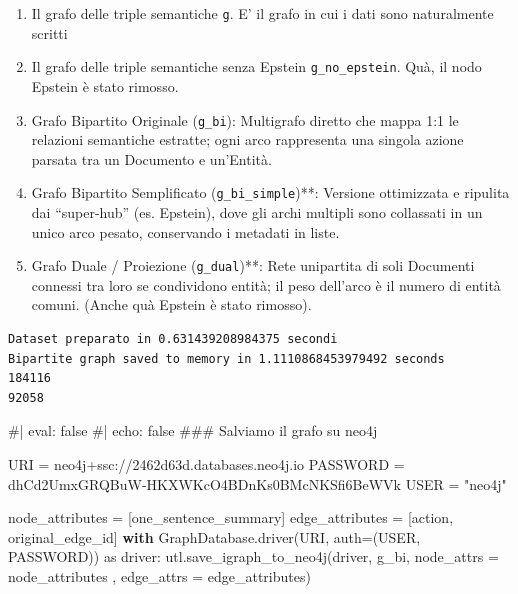 \documentclass[
  italian,
  a4paper,
]{article}
\newenvironment{Shaded}{\begin{snugshade}}{\end{snugshade}}
\newcommand{\CommentTok}[1]{\textcolor[rgb]{0.37,0.37,0.37}{#1}}
\newcommand{\ControlFlowTok}[1]{\textcolor[rgb]{0.00,0.23,0.31}{\textbf{#1}}}
\newcommand{\ImportTok}[1]{\textcolor[rgb]{0.00,0.46,0.62}{#1}}
\newcommand{\NormalTok}[1]{\textcolor[rgb]{0.00,0.23,0.31}{#1}}
\newcommand{\OperatorTok}[1]{\textcolor[rgb]{0.37,0.37,0.37}{#1}}
\newcommand{\StringTok}[1]{\textcolor[rgb]{0.13,0.47,0.30}{#1}}
\providecommand{\tightlist}{%
  \setlength{\itemsep}{0pt}\setlength{\parskip}{0pt}}
\begin{document}
\begin{enumerate}
\def\labelenumi{\arabic{enumi}.}
\tightlist
\item
  Il grafo delle triple semantiche \texttt{g}. E' il grafo in cui i dati
  sono naturalmente scritti
\item
  Il grafo delle triple semantiche senza Epstein
  \texttt{g\_no\_epstein}. Quà, il nodo Epstein è stato rimosso.
\item
  Grafo Bipartito Originale (\texttt{g\_bi}): Multigrafo diretto che
  mappa 1:1 le relazioni semantiche estratte; ogni arco rappresenta una
  singola azione parsata tra un Documento e un'Entità.
\item
  Grafo Bipartito Semplificato (\texttt{g\_bi\_simple})**: Versione
  ottimizzata e ripulita dai ``super-hub'' (es. Epstein), dove gli archi
  multipli sono collassati in un unico arco pesato, conservando i
  metadati in liste.
\item
  Grafo Duale / Proiezione (\texttt{g\_dual})**: Rete unipartita di soli
  Documenti connessi tra loro se condividono entità; il peso dell'arco è
  il numero di entità comuni. (Anche quà Epstein è stato rimosso).
\end{enumerate}

\begin{verbatim}
Dataset preparato in 0.631439208984375 secondi
Bipartite graph saved to memory in 1.1110868453979492 seconds
184116
92058
\end{verbatim}

\begin{Shaded}
\begin{Highlighting}[]

\CommentTok{\#| eval: false}
\CommentTok{\#| echo: false}
\CommentTok{\#\#\# Salviamo il grafo su neo4j}

\NormalTok{URI }\OperatorTok{=} \StringTok{\textquotesingle{}neo4j+ssc://2462d63d.databases.neo4j.io\textquotesingle{}}
\NormalTok{PASSWORD }\OperatorTok{=} \StringTok{\textquotesingle{}dhCd2UmxGRQBuW{-}HKXWKcO4BDnKs0BMcNKSfi6BeWVk\textquotesingle{}}
\NormalTok{USER }\OperatorTok{=} \StringTok{"neo4j"}

\NormalTok{node\_attributes }\OperatorTok{=}\NormalTok{ [}\StringTok{\textquotesingle{}one\_sentence\_summary\textquotesingle{}}\NormalTok{]}
\NormalTok{edge\_attributes }\OperatorTok{=}\NormalTok{ [}\StringTok{\textquotesingle{}action\textquotesingle{}}\NormalTok{, }\StringTok{\textquotesingle{}original\_edge\_id\textquotesingle{}}\NormalTok{]}
\ControlFlowTok{with}\NormalTok{ GraphDatabase.driver(URI, auth}\OperatorTok{=}\NormalTok{(USER, PASSWORD)) }\ImportTok{as}\NormalTok{ driver:}
\NormalTok{     utl.save\_igraph\_to\_neo4j(driver, g\_bi, node\_attrs }\OperatorTok{=}\NormalTok{ node\_attributes , edge\_attrs }\OperatorTok{=}\NormalTok{ edge\_attributes)}
\end{Highlighting}
\end{Shaded}
\end{document}
